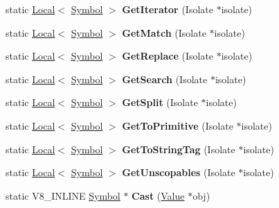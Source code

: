 \begin{DoxyCompactItemize}
static \mbox{\hyperlink{classv8_1_1Local}{Local}}$<$ \mbox{\hyperlink{classv8_1_1Symbol}{Symbol}} $>$ {\bfseries Get\+Iterator} (Isolate $\ast$isolate)
\item 
\mbox{\label{classv8_1_1Symbol_a2372eac85db34c2c3665db1d3fcc4dac}} 
static \mbox{\hyperlink{classv8_1_1Local}{Local}}$<$ \mbox{\hyperlink{classv8_1_1Symbol}{Symbol}} $>$ {\bfseries Get\+Match} (Isolate $\ast$isolate)
\item 
\mbox{\label{classv8_1_1Symbol_a2492651242adc378e88fd6fbdf574db5}} 
static \mbox{\hyperlink{classv8_1_1Local}{Local}}$<$ \mbox{\hyperlink{classv8_1_1Symbol}{Symbol}} $>$ {\bfseries Get\+Replace} (Isolate $\ast$isolate)
\item 
\mbox{\label{classv8_1_1Symbol_a6b825709dea7625c6bc5dec9ce5c2d18}} 
static \mbox{\hyperlink{classv8_1_1Local}{Local}}$<$ \mbox{\hyperlink{classv8_1_1Symbol}{Symbol}} $>$ {\bfseries Get\+Search} (Isolate $\ast$isolate)
\item 
\mbox{\label{classv8_1_1Symbol_a410b12cdc6f02830484367f579145cf0}} 
static \mbox{\hyperlink{classv8_1_1Local}{Local}}$<$ \mbox{\hyperlink{classv8_1_1Symbol}{Symbol}} $>$ {\bfseries Get\+Split} (Isolate $\ast$isolate)
\item 
\mbox{\label{classv8_1_1Symbol_ae038d3f766cbe82f994be4303264235a}} 
static \mbox{\hyperlink{classv8_1_1Local}{Local}}$<$ \mbox{\hyperlink{classv8_1_1Symbol}{Symbol}} $>$ {\bfseries Get\+To\+Primitive} (Isolate $\ast$isolate)
\item 
\mbox{\label{classv8_1_1Symbol_ab595ae7100ce23e4b1677ecab02f5972}} 
static \mbox{\hyperlink{classv8_1_1Local}{Local}}$<$ \mbox{\hyperlink{classv8_1_1Symbol}{Symbol}} $>$ {\bfseries Get\+To\+String\+Tag} (Isolate $\ast$isolate)
\item 
\mbox{\label{classv8_1_1Symbol_acf5b5220a820f6ed1e61500292ebec13}} 
static \mbox{\hyperlink{classv8_1_1Local}{Local}}$<$ \mbox{\hyperlink{classv8_1_1Symbol}{Symbol}} $>$ {\bfseries Get\+Unscopables} (Isolate $\ast$isolate)
\item 
\mbox{\label{classv8_1_1Symbol_aab15294631d6e6eb95b2c8bd1e7eb861}} 
static V8\+\_\+\+I\+N\+L\+I\+NE \mbox{\hyperlink{classv8_1_1Symbol}{Symbol}} $\ast$ {\bfseries Cast} (\mbox{\hyperlink{classv8_1_1Value}{Value}} $\ast$obj)
\end{DoxyCompactItemize}


